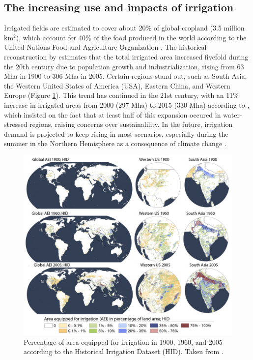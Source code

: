 \subsection{The increasing use and impacts of irrigation}

Irrigated fields are estimated to cover about 20\% of global cropland (3.5 million km$^2$), which account for 40\% of the food produced in the world according to the United Nations Food and Agriculture Organization \citep{UNESCO2019,mcdermid_irrigation_2023}.
The historical reconstruction by \citet{siebert_global_2015} estimates that the total irrigated area increased fivefold during the 20th century due to population growth and industrialization, rising from 63 Mha in 1900 to 306 Mha in 2005. Certain regions stand out, such as South Asia, the Western United States of America (USA), Eastern China, and Western Europe (Figure \ref{irrig_evolution_map}).
This trend has continued in the 21st century, with an 11\% increase in irrigated areas from 2000 (297 Mha) to 2015 (330 Mha) according to \citet{mehta_half_2024}, which insisted on the fact that at least half of this expansion occured in water-stressed regions, raising concerns over sustainalility.
In the future, irrigation demand is projected to keep rising in most scenarios, especially during the summer in the Northern Hemisphere as a consequence of climate change \citep{wada_multimodel_2013,busschaert_net_2022}. 

\begin{figure}[ht]
    \centering
    \includegraphics[width=\textwidth]{images/intro/irrig_evolution_Siebert.png}
    \caption{Percentage of area equipped for irrigation in 1900, 1960, and 2005 according to the Historical Irrigation Dataset (HID). Taken from \citet{siebert_global_2015}.}
    \label{irrig_evolution_map}
\end{figure}

